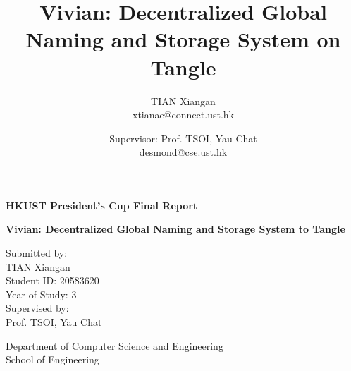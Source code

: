 \documentclass[conference, 10pt]{IEEEtran}
\begin{document}
\begin{titlepage}
    \begin{center}
        \vspace*{1cm}

        \LARGE
        \textbf{HKUST President's Cup Final Report}
        \vspace{0.5cm}

        \Huge
        \textbf{Vivian: Decentralized Global Naming and Storage System to Tangle}

        \vfill

        \Large
        Submitted by: \\
        \vspace{0.3cm}
        TIAN Xiangan \\
        \vspace{0.3cm}
        Student ID: 20583620 \\
        \vspace{0.3cm}
        Year of Study: 3 \\
        \vspace{1.5cm}
        Supervised by: \\
        \vspace{0.3cm}
        Prof. TSOI, Yau Chat


        \vfill

        \vspace{0.8cm}

        \Large
        Department of Computer Science and Engineering \\
        \vspace{0.3cm}
        School of Engineering

    \end{center}
\end{titlepage}

\title{Vivian: Decentralized Global Naming and Storage System on Tangle}

\author{
    TIAN Xiangan \\
    xtianae@connect.ust.hk
    \and
    Supervisor: Prof. TSOI, Yau Chat \\
    desmond@cse.ust.hk
}

\maketitle
\end{document}
